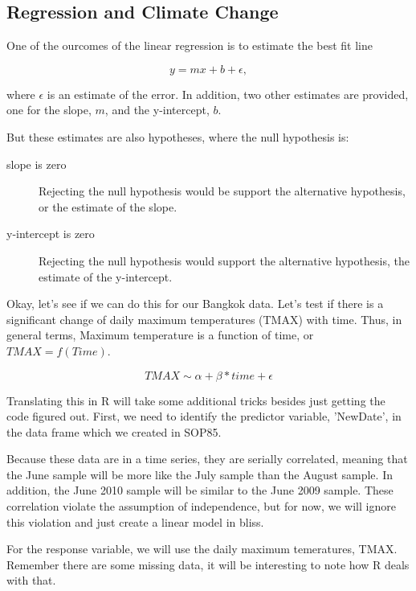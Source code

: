\documentclass{article}\usepackage[]{graphicx}\usepackage[]{color}
\begin{document}
\subsection{Regression and Climate Change}

One of the ourcomes of the linear regression is to estimate the best fit line

\begin{equation}
y = mx + b + \epsilon,
\end{equation}

where $\epsilon$ is an estimate of the error. In addition, two other estimates are provided, one for the slope, $m$, and the y-intercept, $b$. 

But these estimates are also hypotheses, where the null hypothesis is:

\begin{description}
  \item[slope is zero] Rejecting the null hypothesis would be support the alternative hypothesis, or the estimate of the slope. 
  \item[y-intercept is zero] Rejecting the null hypothesis would support the alternative hypothesis, the estimate of the y-intercept.
\end{description}

Okay, let's see if we can do this for our Bangkok data. Let's test if there is a significant change of daily maximum temperatures (TMAX) with time. Thus, in general terms, Maximum temperature is a function of time, or $TMAX = f(Time)$. 

\begin{equation}
TMAX \sim \alpha + \beta * time + \epsilon
\end{equation}

Translating this in R will take some additional tricks besides just getting the code figured out. First, we need to identify the predictor variable, 'NewDate', in the data frame which we created in SOP85. 

Because these data are in a time series, they are serially correlated, meaning that the June sample will be more like the July sample than the August sample. In addition, the June 2010 sample will be similar to the June 2009 sample. These correlation violate the assumption of independence, but for now, we will ignore this violation and just create a linear model in bliss. 

For the response variable, we will use the daily maximum temeratures, TMAX. Remember there are some missing data, it will be interesting to note how R deals with that.
\end{document}
